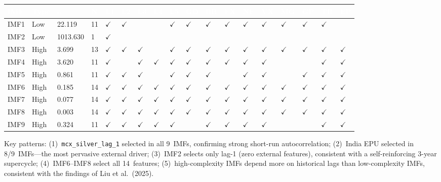 \documentclass[12pt,a4paper]{article}
\newcommand{\cmark}{\ensuremath{\checkmark}}
\newcommand{\hdrrow}[1]{\textcolor{white}{\textbf{#1}}}
\begin{document}
\noindent\scriptsize\setlength{\tabcolsep}{3pt}
\begin{tabular}{C{0.7cm} C{0.9cm} C{1.35cm} C{0.4cm}
  C{0.42cm}C{0.42cm}C{0.42cm}C{0.42cm}C{0.42cm}
  C{0.42cm}C{0.42cm}C{0.42cm}C{0.42cm}C{0.42cm}
  C{0.42cm}C{0.42cm}C{0.42cm}C{0.42cm}}
\hdrrow{IMF} & \hdrrow{Type} & \hdrrow{$\alpha$} & \hdrrow{N} & \hdrrow{L1}&\hdrrow{L2}&\hdrrow{L3}&\hdrrow{L4}&\hdrrow{L5}& \hdrrow{GD}&\hdrrow{BR}&\hdrrow{FX}&\hdrrow{NF}&\hdrrow{VX}& \hdrrow{MG}&\hdrrow{GP}&\hdrrow{TR}&\hdrrow{EP} \\
\hline
IMF1 & Low  & 22.119   & 11 & \cmark&\cmark&     &     &\cmark&\cmark&\cmark&\cmark&\cmark&\cmark&\cmark&\cmark&\cmark& \\
IMF2 & Low  & 1013.630 &  1 & \cmark&     &     &     &     &     &     &     &     &     &     &     &     & \\
IMF3 & High & 3.699    & 13 & \cmark&\cmark&\cmark&     &\cmark&\cmark&\cmark&\cmark&\cmark&\cmark&\cmark&\cmark&\cmark&\cmark \\
IMF4 & High & 3.620    & 11 & \cmark&     &\cmark&\cmark&\cmark&\cmark&\cmark&\cmark&\cmark&\cmark&     &     &\cmark&\cmark \\
IMF5 & High & 0.861    & 11 & \cmark&\cmark&\cmark&     &\cmark&\cmark&\cmark&     &\cmark&\cmark&     &\cmark&\cmark&\cmark \\
IMF6 & High & 0.185    & 14 & \cmark&\cmark&\cmark&\cmark&\cmark&\cmark&\cmark&\cmark&\cmark&\cmark&\cmark&\cmark&\cmark&\cmark \\
IMF7 & High & 0.077    & 14 & \cmark&\cmark&\cmark&\cmark&\cmark&\cmark&\cmark&\cmark&\cmark&\cmark&\cmark&\cmark&\cmark&\cmark \\
IMF8 & High & 0.003    & 14 & \cmark&\cmark&\cmark&\cmark&\cmark&\cmark&\cmark&\cmark&\cmark&\cmark&\cmark&\cmark&\cmark&\cmark \\
IMF9 & High & 0.324    & 11 & \cmark&\cmark&\cmark&\cmark&\cmark&     &\cmark&\cmark&\cmark&\cmark&     &     &\cmark&\cmark \\
\end{tabular}
\renewcommand{\arraystretch}{1}\normalsize\setlength{\tabcolsep}{6pt}
\vspace{6pt}

Key patterns: (1)~\texttt{mcx\_silver\_lag\_1} selected in all 9~IMFs, confirming
strong short-run autocorrelation; (2)~India EPU selected in 8/9~IMFs---the most
pervasive external driver; (3)~IMF2 selects only lag-1 (zero external features),
consistent with a self-reinforcing 3-year supercycle; (4)~IMF6--IMF8 select all
14~features; (5)~high-complexity IMFs depend more on historical lags than
low-complexity IMFs, consistent with the findings of Liu et al.\ (2025).
\end{document}
